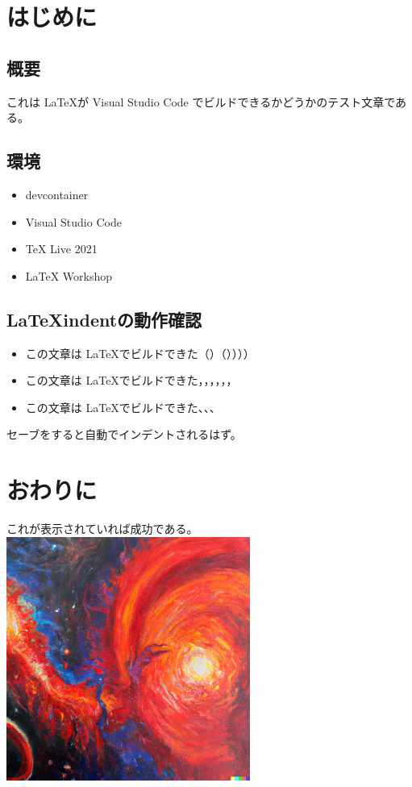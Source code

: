 \documentclass[12pt]{jreport}
\begin{document}
  \chapter{はじめに}
    \section{概要}
      これは \LaTeX が Visual Studio Code でビルドできるかどうかのテスト文章である。
		\section{環境}
			\begin{itemize}
				\item devcontainer
				\item Visual Studio Code
				\item TeX Live 2021
				\item LaTeX Workshop
			\end{itemize}
		\section{\LaTeX indentの動作確認}
			\begin{itemize}
				\item この文章は \LaTeX でビルドできた（）（））））
				\item この文章は \LaTeX でビルドできた，，，，，，
				\item この文章は \LaTeX でビルドできた、、、
			\end{itemize}
			セーブをすると自動でインデントされるはず。
  \chapter{おわりに}
    これが表示されていれば成功である。
		\includegraphics*[width=8cm]{./images/photo.png}
\end{document}
